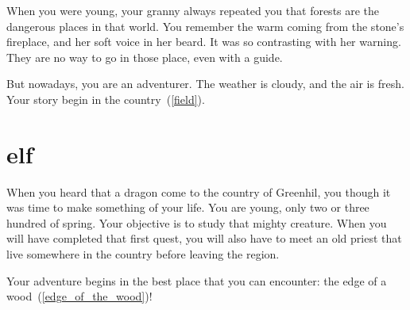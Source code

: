 When you were young, your granny always repeated you that forests are the
dangerous places in that world. You remember the warm coming from the
stone's fireplace, and her soft voice in her beard. It was so contrasting with
her warning. They are no way to go in those place, even with a guide.

But nowadays, you are an adventurer. The weather is cloudy, and the air is
fresh. Your story begin in the country~(\ref{field}).

\section{elf}

When you heard that a dragon come to the country of Greenhil, you though it was
time to make something of your life. You are young, only two or three hundred
of spring. Your objective is to study that mighty creature. When you will have
completed that first quest, you will also have to meet an old priest that live
somewhere in the country before leaving the region.

Your adventure begins in the best place that you can encounter: the edge of a
wood~(\ref{edge_of_the_wood})!
